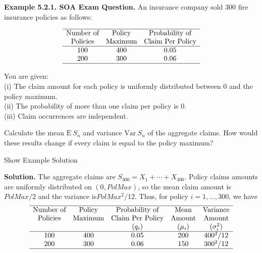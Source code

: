 \documentclass[]{book}
\theoremstyle{definition}
\theoremstyle{definition}
\theoremstyle{definition}
\theoremstyle{remark}
\begin{document}
\textbf{Example 5.2.1. SOA Exam Question.} An insurance company sold 300
fire insurance policies as follows:

\[\begin{matrix}
    \begin{array}{c c c} \hline
        \text{Number of} & \text{Policy} & \text{Probability of}\\
        \text{Policies} &  \text{Maximum} &  \text{Claim Per Policy}\\ \hline
        100 & 400 & 0.05\\
        200 & 300 & 0.06\\ \hline
    \end{array}
\end{matrix}\]

You are given:\\
(i) The claim amount for each policy is uniformly distributed between
\(0\) and the policy maximum.\\
(ii) The probability of more than one claim per policy is \(0\).\\
(iii) Claim occurrences are independent.

Calculate the mean \(\mathrm{E~}S_n\) and variance \(\mathrm{Var~}S_n\)
of the aggregate claims. How would these results change if every claim
is equal to the policy maximum?

Show Example Solution

\hypertarget{toggleExampleAggLoss.2.1}{}
\textbf{Solution.} The aggregate claims are
\(S_{300} = X_1+\cdots+X_{300}\). Policy claims amounts are uniformly
distributed on \((0,PolMax)\), so the mean claim amount is \(PolMax/2\)
and the variance is\(PolMax^2/12\). Thus, for policy \(i=1,...,300\), we
have \[\begin{matrix}
    \begin{array}{ccccc} \hline
        \text{Number of} & \text{Policy} & \text{Probability of} & \text{Mean} & \text{Variance}\\
        \text{Policies} &  \text{Maximum} &  \text{Claim Per Policy} & \text{Amount} & \text{Amount}\\
        & & (q_{i}) & (\mu_{i}) & (\sigma_{i}^2) \\ \hline
        100 & 400 & 0.05 & 200 & 400^2/12\\
        200 & 300 & 0.06 & 150 & 300^2/12 \\ \hline
    \end{array}
\end{matrix}\]
\end{document}

